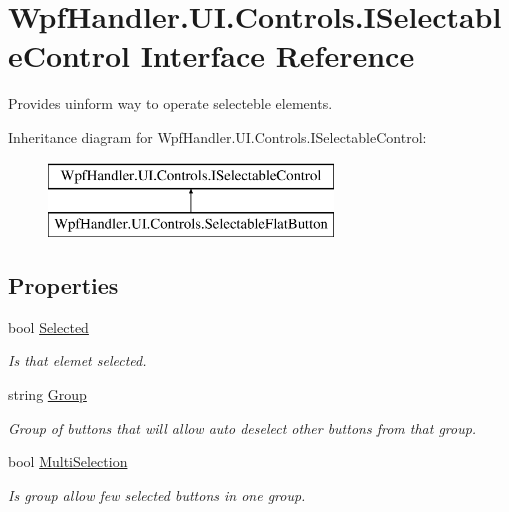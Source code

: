 \hypertarget{interface_wpf_handler_1_1_u_i_1_1_controls_1_1_i_selectable_control}{}\section{Wpf\+Handler.\+U\+I.\+Controls.\+I\+Selectable\+Control Interface Reference}
\label{interface_wpf_handler_1_1_u_i_1_1_controls_1_1_i_selectable_control}


Provides uinform way to operate selecteble elements.  


Inheritance diagram for Wpf\+Handler.\+U\+I.\+Controls.\+I\+Selectable\+Control\+:\begin{figure}[H]
\begin{center}
\leavevmode
\includegraphics[height=2.000000cm]{d9/de5/interface_wpf_handler_1_1_u_i_1_1_controls_1_1_i_selectable_control}
\end{center}
\end{figure}
\subsection*{Properties}
\begin{DoxyCompactItemize}
\item 
bool \mbox{\hyperlink{interface_wpf_handler_1_1_u_i_1_1_controls_1_1_i_selectable_control_a523969837cfcc2e0ed51b4ee7eccc334}{Selected}}
\begin{DoxyCompactList}\small\item\em Is that elemet selected. \end{DoxyCompactList}\item 
string \mbox{\hyperlink{interface_wpf_handler_1_1_u_i_1_1_controls_1_1_i_selectable_control_a65c330a58b8e5fecc26427f9bf00d7f5}{Group}}
\begin{DoxyCompactList}\small\item\em Group of buttons that will allow auto deselect other buttons from that group. \end{DoxyCompactList}\item 
bool \mbox{\hyperlink{interface_wpf_handler_1_1_u_i_1_1_controls_1_1_i_selectable_control_a50ece3d4f219b4f2d391ff8ad6cae619}{Multi\+Selection}}
\begin{DoxyCompactList}\small\item\em Is group allow few selected buttons in one group. \end{DoxyCompactList}\end{DoxyCompactItemize}


